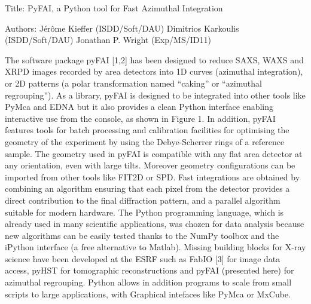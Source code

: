 Title: PyFAI, a Python tool for Fast Azimuthal Integration

Authors: 	Jérôme Kieffer (ISDD/Soft/DAU)
		Dimitrios Karkoulis (ISDD/Soft/DAU)
		Jonathan P. Wright (Exp/MS/ID11)

The software package pyFAI [1,2] has been designed to reduce SAXS, WAXS and XRPD images recorded by area detectors into 1D curves (azimuthal integration), or 2D patterns (a polar transformation named “caking” or “azimuthal regrouping”).
As a library, pyFAI is designed to be integrated into other tools like PyMca and EDNA but it also provides a clean Python interface enabling interactive use from the console, as shown in Figure 1. 
In addition, pyFAI features tools for batch processing and calibration facilities for optimising the geometry of the experiment by using the Debye-Scherrer rings of a reference sample.
The geometry used in pyFAI is compatible with any flat area detector at any orientation, even with large tilts.
Moreover geometry configurations can be imported from other tools like FIT2D or SPD. 
Fast integrations are obtained by combining an algorithm ensuring that each pixel from the detector provides a direct contribution to the final diffraction pattern, and a parallel algorithm suitable for modern hardware.
The Python programming language, which is already used in many scientific applications, was chozen for data analysis because new algorithms can be easily tested thanks to the NumPy toolbox and the iPython interface (a free alternative to Matlab).
Missing building blocks for X-ray science have been developed at the ESRF such as FabIO [3] for image data access, pyHST for tomographic reconstructions and pyFAI (presented here) for azimuthal regrouping.
Python allows in addition programs to scale from small scripts to large applications, with Graphical intefaces like PyMca or MxCube.

